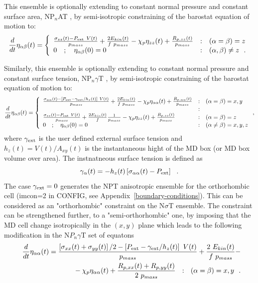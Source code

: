 This ensemble is optionally extending to constant normal pressure
and constant surface area, NP$_{n}$AT \cite{ikeguchi-04a}, by semi-isotropic
constraining of the barostat equation of motion to:
\begin{equation}
\frac{d}{dt} \eta_{\alpha\beta}(t) = \left\{ \begin{array} {l@{\quad:\quad}l}
\frac{\sigma_{zz}(t) - P_{\rm ext}~V(t)}{p_{mass}} + \frac{2 E_{kin}(t)}{f~p_{mass}} -
\chi_{p} \eta_{zz}(t) + \frac{R_{p,zz}(t)}{p_{mass}} & (\alpha = \beta) = z \\
0~~~;~~~\eta_{\alpha\beta}(0) = 0 & (\alpha,\beta) \ne z~~.
\end{array} \right.
\end{equation}

Similarly, this ensemble is optionally extending to constant
normal pressure and constant surface tension, NP$_{n}\gamma$T
\cite{ikeguchi-04a}, by semi-isotropic constraining of the
barostat equation of motion to:
\begin{equation}
\frac{d}{dt} \eta_{\alpha\beta}(t) = \left\{ \begin{array} {l@{\quad:\quad}l}
\frac{\sigma_{\alpha\alpha}(t) - \left[ P_{\rm ext} - \gamma_{\rm ext} / h_{z}(t) \right]~V(t)}{p_{mass}} +
\frac{2 E_{kin}(t)}{f~p_{mass}} - \chi_{p} \eta_{\alpha\alpha}(t) +
\frac{R_{p,\alpha\alpha}(t)}{p_{mass}} & (\alpha = \beta) = x,y \\
& \\
\frac{\sigma_{zz}(t) - P_{\rm ext}~V(t)}{p_{mass}} +
\frac{2 E_{kin}(t)}{f} \frac{1}{p_{mass}} - \chi_{p} \eta_{zz}(t) +
\frac{R_{p,zz}(t)}{p_{mass}} & (\alpha = \beta) = z \\
0~~~;~~~\eta_{\alpha\beta}(0) = 0 & (\alpha \ne \beta) = x,y,z
\end{array} \right. ,
\end{equation}
where $\gamma_{\rm ext}$ is the user defined external surface tension
and $h_{z}(t) = V(t) / A_{xy}(t)$ is the instantaneous hight of the
MD box (or MD box volume over area).  The instnatneous surface
tension is defined as
\begin{equation}
\gamma_{\alpha}(t)=-h_{z}(t)\left[ \sigma_{\alpha\alpha}(t) - P_{\rm ext} \right]~~.\label{gamma}
\end{equation}
The case $\gamma_{\rm ext}=0$ generates the NPT anisotropic ensemble for
the orthorhombic cell (imcon=2 in CONFIG, see Appendix~\ref{boundary-conditions}).
This can be considered as an "orthorhombic" constraint on the N$\sigma$T ensemble.
The constraint can be strengthened further, to a "semi-orthorhombic" one, by
imposing that the MD cell change isotropically in the $(x,y)$ plane
which leads to the following modification in the N$P_{n}\gamma$T set of equatons
\begin{eqnarray}
\frac{d}{dt} \eta_{\alpha\alpha}(t) = \frac{\left[\sigma_{xx}(t)+\sigma_{yy}(t)\right]/2 -
\left[ P_{\rm ext} - \gamma_{\rm ext} / h_{z}(t) \right]~V(t)}{p_{mass}} +
\frac{2~E_{kin}(t)}{f~p_{mass}} - \\
\phantom{xxxxxxxxxxxxxx}- \chi_{p} \eta_{\alpha\alpha}(t) +
\frac{R_{p,xx}(t)+R_{p,yy}(t)}{2~p_{mass}}~~:~~(\alpha = \beta) = x,y~~.\nonumber
\end{eqnarray}

